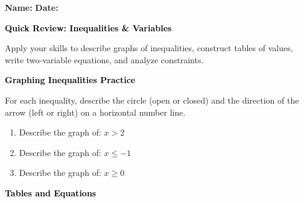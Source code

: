 \documentclass[12pt, letterpaper, fleqn]{article}
\begin{document}
\textbf{Name:} \underline{\hspace{5cm}}
\hfill
\textbf{Date:} \underline{\hspace{3cm}}\\

\begin{tcolorbox}[colback=black!10]
    \large\textcolor{black}{\textbf{Quick Review: Inequalities \& Variables}}
\end{tcolorbox}

\vspace{3mm}
\noindent
Apply your skills to describe graphs of inequalities, construct tables of values, write two-variable equations, and analyze constraints.

\vspace{4mm}

\begin{tcolorbox}[colback=black!10]
\large\textcolor{black}{\textbf{Graphing Inequalities Practice}}
\end{tcolorbox}

\noindent
For each inequality, describe the circle (open or closed) and the direction of the arrow (left or right) on a horizontal number line.

\vspace{3mm}

\begin{enumerate}[itemsep=2.2cm, leftmargin=0.6cm]

\item Describe the graph of: $x > 2$

\vspace{2cm}

\item Describe the graph of: $x \le -1$

\vspace{2cm}

\item Describe the graph of: $x \ge 0$

\vspace{2cm}

\end{enumerate}

\newpage

\begin{tcolorbox}[colback=black!10]
\large\textcolor{black}{\textbf{Tables and Equations}}
\end{tcolorbox}
\end{document}
